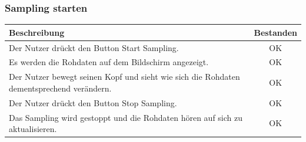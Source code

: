 \documentclass[a4paper,12pt]{article}
\newcommand{\testok}[0]{
	\cellcolor{green!25} OK
}
\begin{document}
\subsubsection{Sampling starten}
\begin{tabular}{ | p{12cm} | c| }
	\hline
	\textbf{Beschreibung} & \textbf{Bestanden}\\
	\hline
	Der Nutzer drückt den Button \glqq{}Start Sampling\grqq{}. & \testok \\
	\hline
	Es werden die Rohdaten auf dem Bildschirm angezeigt. & \testok \\
	\hline
	Der Nutzer bewegt seinen Kopf und sieht wie sich die Rohdaten dementsprechend verändern. & \testok \\
	\hline
	Der Nutzer drückt den Button \glqq{}Stop Sampling\grqq{}. & \testok \\
	\hline
	Das Sampling wird gestoppt und die Rohdaten hören auf sich zu aktualisieren. & \testok \\
	\hline
\end{tabular}
\\ \\ \\ \\
\begin{figure}[h]
	\centering
\end{figure}
\FloatBarrier
\end{document}
